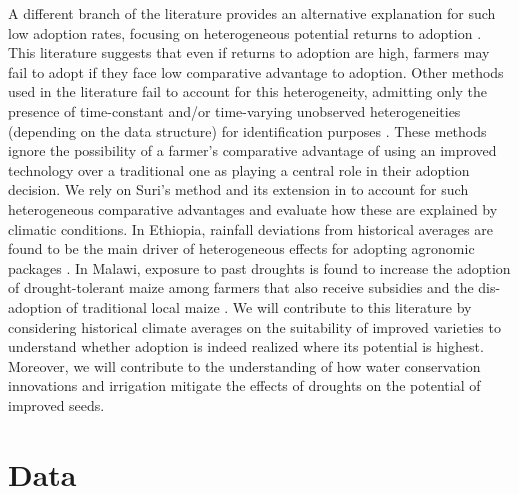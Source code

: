 \documentclass{article}
\begin{document}
A different branch of the literature provides an alternative explanation for such low adoption rates, focusing on heterogeneous potential returns to adoption \citep{Suri2011-oi}. This literature suggests that even if returns to adoption are high, farmers may fail to adopt if they face low comparative advantage to adoption. Other methods used in the literature fail to account for this heterogeneity, admitting only the presence of time-constant and/or time-varying unobserved heterogeneities (depending on the data structure) for identification purposes \citep{Kassie2018-xn,Falco2011-rt}. These methods ignore the possibility of a farmer’s comparative advantage of using an improved technology over a traditional one as playing a central role in their adoption decision. We rely on Suri’s method and its extension in \citep{Tjernstrom_Emilia_Dalia_Ghanem_Oscar_Barriga_Cabanillas_Travis_J_Lybbert_Jeffrey_D_Michler_and_Aleksandr_Michuda2020-bc} to account for such heterogeneous comparative advantages and evaluate how these are explained by climatic conditions. In Ethiopia, rainfall deviations from historical averages are found to be the main driver of heterogeneous effects for adopting agronomic packages \citep{Marenya2020-kb}. In Malawi, exposure to past droughts is found to increase the adoption of drought-tolerant maize among farmers that also receive subsidies \citep{Katengeza2019-af} and the dis-adoption of traditional local maize \citep{Holden2016-vy}. We will contribute to this literature by considering historical climate averages on the suitability of improved varieties to understand whether adoption is indeed realized where its potential is highest. Moreover, we will contribute to the understanding of how water conservation innovations and irrigation mitigate the effects of droughts on the potential of improved seeds.

\section{Data}
\end{document}
